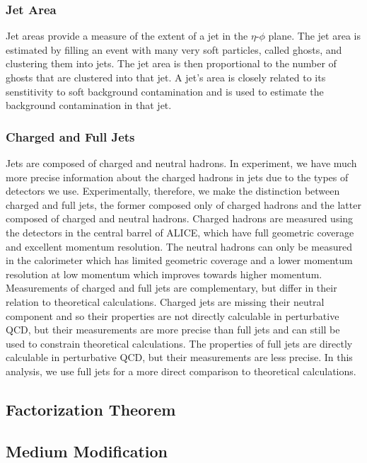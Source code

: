 \subsubsection*{Jet Area}
Jet areas provide a measure of the extent of a jet in the $\eta$-$\phi$ plane. The jet area is estimated by filling an event with many very soft particles, called ghosts, and clustering them into jets. The jet area is then proportional to the number of ghosts that are clustered into that jet. A jet's area is closely related to its senstitivity to soft background contamination and is used to estimate the background contamination in that jet. 

\subsubsection*{Charged and Full Jets} 
Jets are composed of charged and neutral hadrons. In experiment, we have much more precise information about the charged hadrons in jets due to the types of detectors we use. Experimentally, therefore, we make the distinction between charged and full jets, the former composed only of charged hadrons and the latter composed of charged and neutral hadrons. Charged hadrons are measured using the detectors in the central barrel of ALICE, which have full geometric coverage and excellent momentum resolution.  The neutral hadrons can only be measured in the calorimeter which has limited geometric coverage and a lower momentum resolution at low momentum which improves towards higher momentum. Measurements of charged and full jets are complementary, but differ in their relation to theoretical calculations. Charged jets are missing their neutral component and so their properties are not directly calculable in perturbative QCD, but their measurements are more precise than full jets and can still be used to constrain theoretical calculations. The properties of full jets are directly calculable in perturbative QCD, but their measurements are less precise. In this analysis, we use full jets for a more direct comparison to theoretical calculations.

\subsection*{Factorization Theorem}

\subsection*{Medium Modification}

